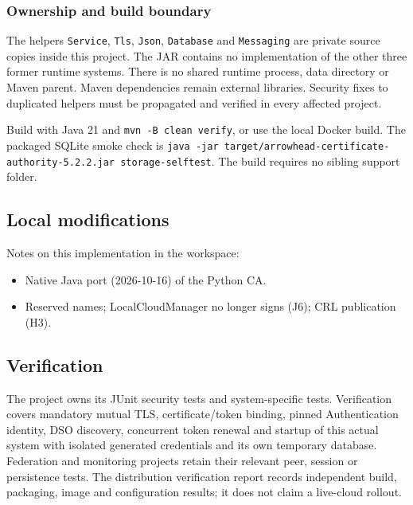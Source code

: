 \documentclass[a4paper]{arrowhead}
\begin{document}
\subsubsection{Ownership and build boundary}
The helpers \texttt{Service}, \texttt{Tls}, \texttt{Json}, \texttt{Database} and \texttt{Messaging} are private source copies inside this project. The JAR contains no implementation of the other three former runtime systems. There is no shared runtime process, data directory or Maven parent. Maven dependencies remain external libraries. Security fixes to duplicated helpers must be propagated and verified in every affected project.

Build with Java 21 and \texttt{mvn -\allowbreak{}B clean verify}, or use the local Docker build. The packaged SQLite smoke check is \texttt{java -\allowbreak{}jar target/\allowbreak{}arrowhead-\allowbreak{}certificate-\allowbreak{}authority-\allowbreak{}5.2.2.jar storage-\allowbreak{}selftest}. The build requires no sibling support folder.

\subsection{Local modifications}
\label{sec:local}

Notes on this implementation in the workspace:
\begin{itemize}
  \item Native Java port (2026-10-16) of the Python CA.
  \item Reserved names; LocalCloudManager no longer signs (J6); CRL publication (H3).
\end{itemize}

\subsection{Verification}

The project owns its JUnit security tests and system-specific tests. Verification covers mandatory mutual TLS, certificate/token binding, pinned Authentication identity, DSO discovery, concurrent token renewal and startup of this actual system with isolated generated credentials and its own temporary database. Federation and monitoring projects retain their relevant peer, session or persistence tests. The distribution verification report records independent build, packaging, image and configuration results; it does not claim a live-cloud rollout.

\newpage
\end{document}
